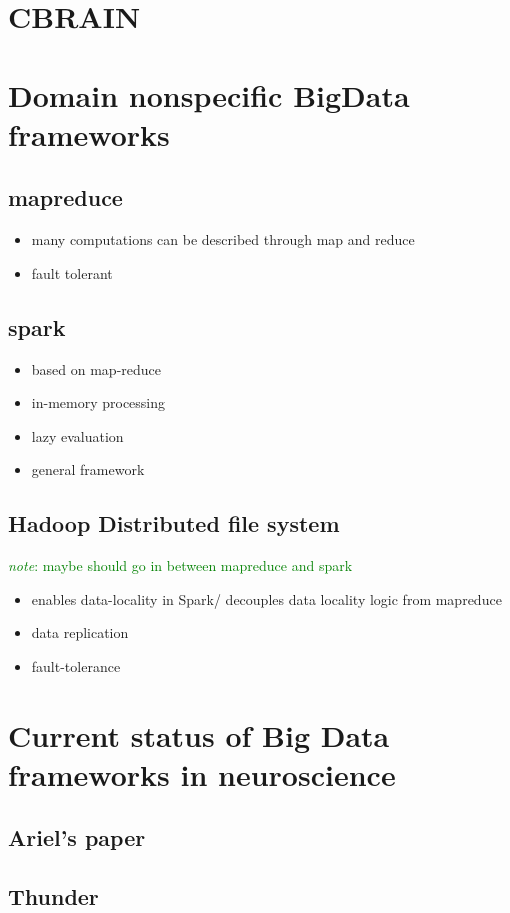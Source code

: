 \documentclass{report}
\newcommand{\note}[1]{\textcolor{green}{\textit{note}: #1}}
\begin{document}
\chapter{CBRAIN}
\chapter{Domain nonspecific BigData frameworks}
	\section{mapreduce}
		\begin{itemize}
			\item many computations can be described through map and reduce
			\item fault tolerant
		\end{itemize}
	\section{spark}
		\begin{itemize}
			\item based on map-reduce
			\item in-memory processing
			\item lazy evaluation
			\item general framework
		\end{itemize}
	\section{Hadoop Distributed file system}
		\note{maybe should go in between mapreduce and spark}
		\begin{itemize}
			\item enables data-locality in Spark/ decouples data locality logic from mapreduce\
			\item data replication
			\item fault-tolerance
		\end{itemize}
\chapter{Current status of Big Data frameworks in neuroscience}
	\section{Ariel's paper}
	\section{Thunder}
\end{document}
